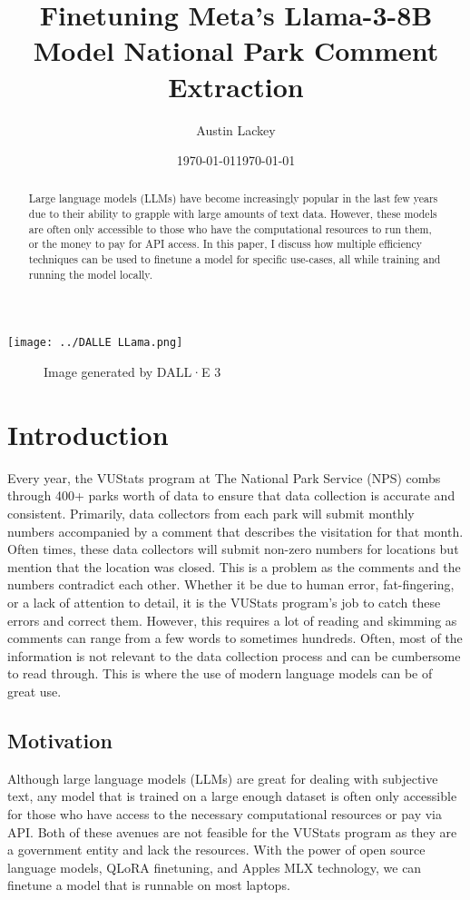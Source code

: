 \documentclass[12pt]{article}
\date{\today}
\title{\textbf{Finetuning Meta's Llama-3-8B Model National Park Comment Extraction}}
\author{Austin Lackey}
\date{\today}
\begin{document}
\maketitle

\begin{abstract}
    \normalsize
    Large language models (LLMs) have become increasingly popular in the last few years due to their ability to grapple with large amounts of text data. However, these models are often only accessible to those who have the computational resources to run them, or the money to pay for API access. In this paper, I discuss how multiple efficiency techniques can be used to finetune a model for specific use-cases, all while training and running the model locally.
\end{abstract}

\begin{center}
    \texttt{[image: ../DALLE LLama.png]}
    \begin{figure}
        \caption{Image generated by DALL·E 3 \cite{dalle3}}
    \end{figure}
\end{center}

\section{Introduction}
Every year, the VUStats program at The National Park Service (NPS) combs through 400+ parks worth of data to ensure that data collection is accurate and consistent. Primarily, data collectors from each park will submit monthly numbers accompanied by a comment that describes the visitation for that month. Often times, these data collectors will submit non-zero numbers for locations but mention that the location was closed. This is a problem as the comments and the numbers contradict each other. Whether it be due to human error, fat-fingering, or a lack of attention to detail, it is the VUStats program's job to catch these errors and correct them. However, this requires a lot of reading and skimming as comments can range from a few words to sometimes hundreds. Often, most of the information is not relevant to the data collection process and can be cumbersome to read through. This is where the use of modern language models can be of great use.

\subsection{Motivation}
Although large language models (LLMs) are great for dealing with subjective text, any model that is trained on a large enough dataset is often only accessible for those who have access to the necessary computational resources or pay via API. Both of these avenues are not feasible for the VUStats program as they are a government entity and lack the resources. With the power of open source language models, QLoRA finetuning, and Apples MLX technology, we can finetune a model that is runnable on most laptops.
\end{document}
